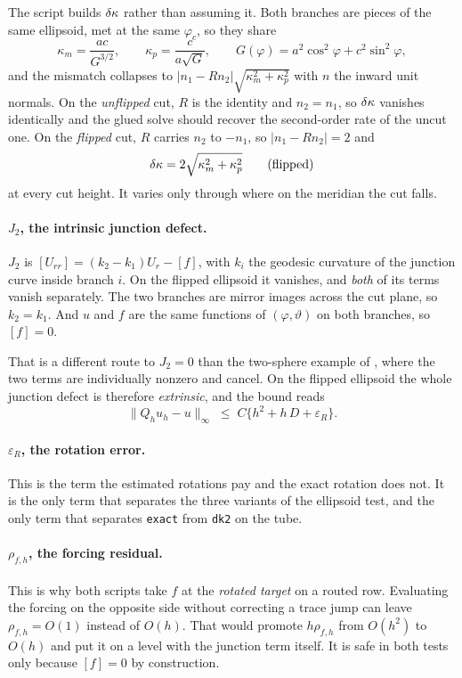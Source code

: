 The script builds $\delta\kappa$ rather than assuming it. Both branches are pieces
of the same ellipsoid, met at the same $\varphi_c$, so they share
\begin{equation}
  \kappa_m = \frac{ac}{G^{3/2}}, \qquad
  \kappa_p = \frac{c}{a\sqrt{G}}, \qquad
  G(\varphi) = a^2\cos^2\!\varphi + c^2\sin^2\!\varphi ,
\end{equation}
and the mismatch collapses to $|n_1 - Rn_2|\sqrt{\kappa_m^2+\kappa_p^2}$
with $n$ the inward unit normals. On the \emph{unflipped} cut, $R$ is the
identity and $n_2=n_1$, so $\delta\kappa$ vanishes identically and the glued solve
should recover the second-order rate of the uncut one. On the
\emph{flipped} cut, $R$ carries $n_2$ to $-n_1$, so $|n_1-Rn_2|=2$ and
\begin{equation}
  \delta\kappa = 2\sqrt{\kappa_m^2 + \kappa_p^2}
  \qquad\text{(flipped)}
\end{equation}
at every cut height. It varies only through where on the meridian the cut
falls.

\paragraph{$J_2$, the intrinsic junction defect.} $J_2$ is
$[U_{rr}] = (k_2-k_1)U_r - [f]$, with $k_i$ the geodesic curvature of the
junction curve inside branch $i$. On the flipped ellipsoid it vanishes,
and \emph{both} of its terms vanish separately. The two branches are
mirror images across the cut plane, so $k_2=k_1$. And $u$ and $f$ are the
same functions of $(\varphi,\vartheta)$ on both branches, so $[f]=0$.

That is a different route to $J_2=0$ than the two-sphere example of
\cite{MMC2026b}, where the two terms are individually nonzero and cancel.
On the flipped ellipsoid the whole junction defect is therefore
\emph{extrinsic}, and the bound reads
\begin{equation}
  \bigl\| Q_h u_h - u \bigr\|_\infty
  \;\le\; C\bigl\{ h^2 + h\,D + \varepsilon_R \bigr\} .
  \label{eq:bound3}
\end{equation}

\paragraph{$\varepsilon_R$, the rotation error.} This is the term the
estimated rotations pay and the exact rotation does not. It is the only
term that separates the three variants of the ellipsoid test, and the
only term that separates \texttt{exact} from \texttt{dk2} on the tube.

\paragraph{$\rho_{f,h}$, the forcing residual.} This is why both scripts
take $f$ at the \emph{rotated target} on a routed row. Evaluating the
forcing on the opposite side without correcting a trace jump can leave
$\rho_{f,h}=O(1)$ instead of $O(h)$. That would promote $h\rho_{f,h}$
from $O(h^2)$ to $O(h)$ and put it on a level with the junction term
itself. It is safe in both tests only because $[f]=0$ by construction.
